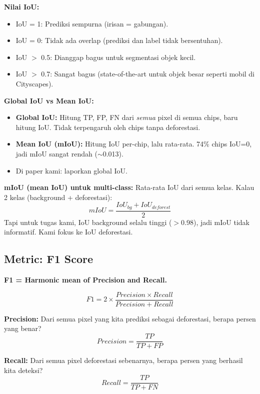 \documentclass[10pt,a4paper,onecolumn]{article}
\begin{document}
\textbf{Nilai IoU:}
\begin{itemize}[nosep]
    \item IoU = 1: Prediksi sempurna (irisan = gabungan).
    \item IoU = 0: Tidak ada overlap (prediksi dan label tidak
          bersentuhan).
    \item IoU $>$ 0.5: Dianggap bagus untuk segmentasi objek kecil.
    \item IoU $>$ 0.7: Sangat bagus (state-of-the-art untuk objek
          besar seperti mobil di Cityscapes).
\end{itemize}

\textbf{Global IoU vs Mean IoU:}
\begin{itemize}[nosep]
    \item \textbf{Global IoU:} Hitung TP, FP, FN dari \textit{semua}
          pixel di semua chips, baru hitung IoU. Tidak terpengaruh
          oleh chips tanpa deforestasi.
    \item \textbf{Mean IoU (mIoU):} Hitung IoU per-chip, lalu
          rata-rata. 74\% chips IoU=0, jadi mIoU sangat rendah
          ($\sim$0.013).
    \item Di paper kami: laporkan global IoU.
\end{itemize}

\textbf{mIoU (mean IoU) untuk multi-class:} Rata-rata IoU dari
semua kelas. Kalau 2 kelas (background + deforestasi):
$$mIoU = \frac{IoU_{bg} + IoU_{deforest}}{2}$$
Tapi untuk tugas kami, IoU background selalu tinggi ($>$0.98),
jadi mIoU tidak informatif. Kami fokus ke IoU deforestasi.

\subsection{Metric: F1 Score}

\textbf{F1 = Harmonic mean of Precision and Recall.}

$$F1 = 2 \times \frac{Precision \times Recall}{Precision + Recall}$$

\textbf{Precision:} Dari semua pixel yang kita prediksi sebagai
deforestasi, berapa persen yang benar?
$$Precision = \frac{TP}{TP + FP}$$

\textbf{Recall:} Dari semua pixel deforestasi sebenarnya, berapa
persen yang berhasil kita deteksi?
$$Recall = \frac{TP}{TP + FN}$$
\end{document}
